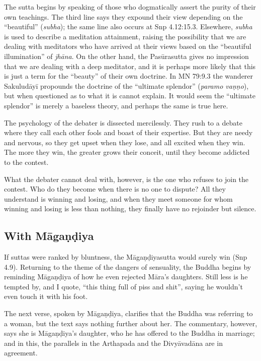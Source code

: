 \documentclass[12pt,openany]{book}%
\begin{document}
The sutta begins by speaking of those who dogmatically assert the purity of their own teachings. The third line says they expound their view depending on the “beautiful” (\textit{subha}); the same line also occurs at Snp 4.12:15.3. Elsewhere, \textit{subha} is used to describe a meditation attainment, raising the possibility that we are dealing with meditators who have arrived at their views based on the “beautiful illumination” of \textit{\textsanskrit{jhāna}}. On the other hand, the \textsanskrit{Pasūrasutta} gives no impression that we are dealing with a deep meditator, and it is perhaps more likely that this is just a term for the “beauty” of their own doctrine. In MN 79:9.3 the wanderer \textsanskrit{Sakuludāyī} propounds the doctrine of the “ultimate splendor” (\textit{paramo \textsanskrit{vaṇṇo}}), but when questioned as to what it is cannot explain. It would seem the “ultimate splendor” is merely a baseless theory, and perhaps the same is true here.

The psychology of the debater is dissected mercilessly. They rush to a debate where they call each other fools and boast of their expertise. But they are needy and nervous, so they get upset when they lose, and all excited when they win. The more they win, the greater grows their conceit, until they become addicted to the contest.

What the debater cannot deal with, however, is the one who refuses to join the contest. Who do they become when there is no one to dispute? All they understand is winning and losing, and when they meet someone for whom winning and losing is less than nothing, they finally have no rejoinder but silence.

\subsection*{With \textsanskrit{Māgaṇḍiya}}

If suttas were ranked by bluntness, the \textsanskrit{Māgaṇḍiyasutta} would surely win (Snp 4.9). Returning to the theme of the dangers of sensuality, the Buddha begins by reminding \textsanskrit{Māgaṇḍiya} of how he even rejected \textsanskrit{Māra}’s daughters. Still less is he tempted by, and I quote, “this thing full of piss and shit”, saying he wouldn’t even touch it with his foot.

The next verse, spoken by \textsanskrit{Māgaṇḍiya}, clarifies that the Buddha was referring to a woman, but the text says nothing further about her. The commentary, however, says she is \textsanskrit{Māgaṇḍiya}’s daughter, who he has offered to the Buddha in marriage; and in this, the parallels in the Arthapada and the \textsanskrit{Divyāvadāna} are in agreement.
\end{document}
